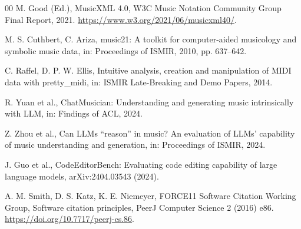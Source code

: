 \documentclass[preprint,12pt,a4paper]{elsarticle}
\begin{document}
\begin{thebibliography}{00}
M. Good (Ed.), MusicXML 4.0, W3C Music Notation Community Group Final Report, 2021.
\newblock \url{https://www.w3.org/2021/06/musicxml40/}.

M. S. Cuthbert, C. Ariza, music21: A toolkit for computer-aided musicology and
symbolic music data, in: Proceedings of ISMIR, 2010, pp. 637--642.

C. Raffel, D. P. W. Ellis, Intuitive analysis, creation and manipulation of MIDI
data with pretty\_midi, in: ISMIR Late-Breaking and Demo Papers, 2014.

R. Yuan et al., ChatMusician: Understanding and generating music intrinsically with
LLM, in: Findings of ACL, 2024.

Z. Zhou et al., Can LLMs ``reason'' in music? An evaluation of LLMs' capability of
music understanding and generation, in: Proceedings of ISMIR, 2024.

J. Guo et al., CodeEditorBench: Evaluating code editing capability of large language
models, arXiv:2404.03543 (2024).

A. M. Smith, D. S. Katz, K. E. Niemeyer, FORCE11 Software Citation Working Group,
Software citation principles, PeerJ Computer Science 2 (2016) e86.
\newblock \url{https://doi.org/10.7717/peerj-cs.86}.
\end{thebibliography}
\end{document}
